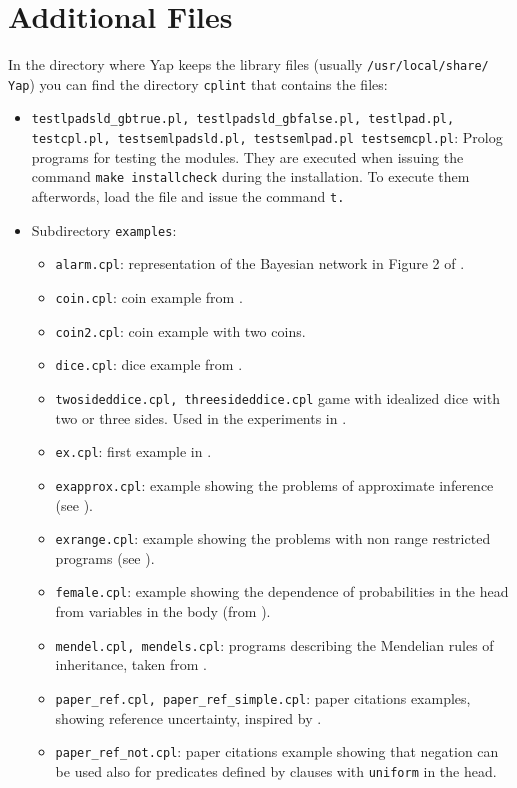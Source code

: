 \documentclass[a4paper,12pt]{article}
\begin{document}
\section{Additional Files}
In the directory where Yap keeps the library files (usually \texttt{/usr/local/share/ Yap}) you can find the directory \texttt{cplint} that contains the files:
\begin{itemize}
\item \verb|testlpadsld_gbtrue.pl, testlpadsld_gbfalse.pl, testlpad.pl,| 
\verb|testcpl.pl, testsemlpadsld.pl, testsemlpad.pl testsemcpl.pl|: Prolog programs for testing the modules. They are executed when issuing the command \texttt{make installcheck} during the installation. To execute them afterwords, load the file and issue the command \texttt{t.} 
\item Subdirectory \texttt{examples}:
\begin{itemize}
\item \texttt{alarm.cpl}: representation of the Bayesian network in Figure 2 of
 \cite{VenVer04-ICLP04-IC}.
\item \texttt{coin.cpl}: coin example from   \cite{VenVer04-ICLP04-IC}.
\item \texttt{coin2.cpl}: coin example with two coins.
\item \texttt{dice.cpl}: dice example from \cite{VenVer04-ICLP04-IC}.
\item \verb|twosideddice.cpl, threesideddice.cpl|  game with idealized dice with two or three  sides. Used in the experiments in \cite{Rig-RCRA07-IC}.
\item \texttt{ex.cpl}: first example in \cite{Rig-RCRA07-IC}.
\item \texttt{exapprox.cpl}: example showing the problems of approximate inference (see \cite{Rig-RCRA07-IC}).
\item \texttt{exrange.cpl}: example showing the problems with non range restricted programs (see \cite{Rig-RCRA07-IC}).
\item \texttt{female.cpl}: example showing the dependence of probabilities in the head from variables in the body (from \cite{VenVer04-ICLP04-IC}).
\item \texttt{mendel.cpl, mendels.cpl}: programs describing the Mendelian rules of inheritance, taken from \cite{Blo04-ILP04WIP-IC}.
\item \verb|paper_ref.cpl, paper_ref_simple.cpl|: paper citations examples, showing reference uncertainty, inspired by \cite{Getoor+al:JMLR02}.
\item \verb|paper_ref_not.cpl|: paper citations example showing that negation can be used also for predicates defined by clauses with \texttt{uniform} in the head.

\end{itemize}
\end{itemize}
\end{document}
